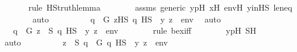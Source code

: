 \begin{isabellebody}
\ \ \ \ \ \ \isamarkupfalse%
{\isacharparenleft}{\kern0pt}rule\ HS{\isacharunderscore}{\kern0pt}truth{\isacharunderscore}{\kern0pt}lemma{\isacharparenright}{\kern0pt}\isanewline
\ \ \ \ \ \ \isamarkupfalse%
\ assms\ generic\ y{\isacharprime}{\kern0pt}pH\ x{\isacharprime}{\kern0pt}H\ env{\isacharprime}{\kern0pt}H\ y{\isacharprime}{\kern0pt}inHS\ leneq\isanewline
\ \ \ \ \ \ \isamarkupfalse%
\ auto\isanewline
\ \ \ \ \isamarkupfalse%
\ \isamarkupfalse%
\ {\isachardoublequoteopen}{\isachardot}{\kern0pt}{\isachardot}{\kern0pt}{\isachardot}{\kern0pt}\ {\isasymlongleftrightarrow}\ {\isacharparenleft}{\kern0pt}{\isasymexists}q\ {\isasymin}\ G{\isachardot}{\kern0pt}\ {\isasymexists}z{\isacharprime}{\kern0pt}{\isasymin}HS{\isachardot}{\kern0pt}\ q\ {\isasymtturnstile}HS\ {\isasymphi}\ {\isacharbrackleft}{\kern0pt}y{\isacharprime}{\kern0pt}{\isacharcomma}{\kern0pt}\ z{\isacharprime}{\kern0pt}{\isacharbrackright}{\kern0pt}\ {\isacharat}{\kern0pt}\ env{\isacharprime}{\kern0pt}{\isacharparenright}{\kern0pt}{\isachardoublequoteclose}\ \isamarkupfalse%
\ auto\isanewline
\ \ \ \ \isamarkupfalse%
\ \isamarkupfalse%
\ {\isachardoublequoteopen}{\isachardot}{\kern0pt}{\isachardot}{\kern0pt}{\isachardot}{\kern0pt}\ {\isasymlongleftrightarrow}\ {\isacharparenleft}{\kern0pt}{\isasymexists}q\ {\isasymin}\ G{\isachardot}{\kern0pt}\ {\isasymexists}z{\isacharprime}{\kern0pt}\ {\isasymin}\ S{\isachardot}{\kern0pt}\ q\ {\isasymtturnstile}HS\ {\isasymphi}\ {\isacharparenleft}{\kern0pt}{\isacharbrackleft}{\kern0pt}y{\isacharprime}{\kern0pt}{\isacharcomma}{\kern0pt}\ z{\isacharprime}{\kern0pt}{\isacharbrackright}{\kern0pt}\ {\isacharat}{\kern0pt}\ env{\isacharprime}{\kern0pt}{\isacharparenright}{\kern0pt}{\isacharparenright}{\kern0pt}{\isachardoublequoteclose}\ \isanewline
\ \ \ \ \ \ \isamarkupfalse%
{\isacharparenleft}{\kern0pt}rule\ bex{\isacharunderscore}{\kern0pt}iff{\isacharparenright}{\kern0pt}\isanewline
\ \ \ \ \ \ \isamarkupfalse%
\ y{\isacharprime}{\kern0pt}pH\ SH\isanewline
\ \ \ \ \ \ \isamarkupfalse%
\ auto\isanewline
\ \ \ \ \isamarkupfalse%
\ \isamarkupfalse%
\ {\isachardoublequoteopen}{\isachardot}{\kern0pt}{\isachardot}{\kern0pt}{\isachardot}{\kern0pt}\ {\isasymlongleftrightarrow}\ {\isacharparenleft}{\kern0pt}{\isasymexists}z{\isacharprime}{\kern0pt}\ {\isasymin}\ S{\isachardot}{\kern0pt}\ {\isasymexists}q\ {\isasymin}\ G{\isachardot}{\kern0pt}\ q\ {\isasymtturnstile}HS\ {\isasymphi}\ {\isacharparenleft}{\kern0pt}{\isacharbrackleft}{\kern0pt}y{\isacharprime}{\kern0pt}{\isacharcomma}{\kern0pt}\ z{\isacharprime}{\kern0pt}{\isacharbrackright}{\kern0pt}\ {\isacharat}{\kern0pt}\ env{\isacharprime}{\kern0pt}{\isacharparenright}{\kern0pt}{\isacharparenright}{\kern0pt}{\isachardoublequoteclose}\ \isamarkupfalse%

\end{isabellebody}
